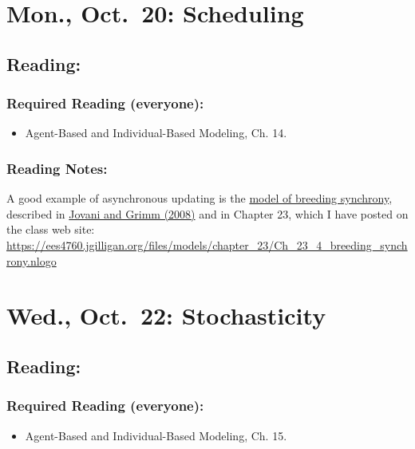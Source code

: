 \documentclass[
]{article}
\providecommand{\tightlist}{%
  \setlength{\itemsep}{0pt}\setlength{\parskip}{0pt}}
\begin{document}
\section{Mon., Oct.~20: Scheduling}\label{mon.-oct.-20-scheduling}

\subsection{Reading:}\label{reading-16}

\subsubsection{Required Reading
(everyone):}\label{required-reading-everyone-13}

\begin{itemize}
\tightlist
\item
  Agent-Based and Individual-Based Modeling, Ch. 14.
\end{itemize}

\subsubsection{Reading Notes:}\label{reading-notes-13}

A good example of asynchronous updating is the
\href{/files/models/chapter_23/Ch_23_4_breeding_synchrony.nlogo}{model
of breeding synchrony}, described in
\href{/files/models/chapter_05/Jovani_Grimm_2008_Breeding.pdf}{Jovani
and Grimm (2008)} and in Chapter 23, which I have posted on the class
web site:
\url{https://ees4760.jgilligan.org/files/models/chapter_23/Ch_23_4_breeding_synchrony.nlogo}

\section{Wed., Oct.~22: Stochasticity}\label{wed.-oct.-22-stochasticity}

\subsection{Reading:}\label{reading-17}

\subsubsection{Required Reading
(everyone):}\label{required-reading-everyone-14}

\begin{itemize}
\tightlist
\item
  Agent-Based and Individual-Based Modeling, Ch. 15.
\end{itemize}
\end{document}

